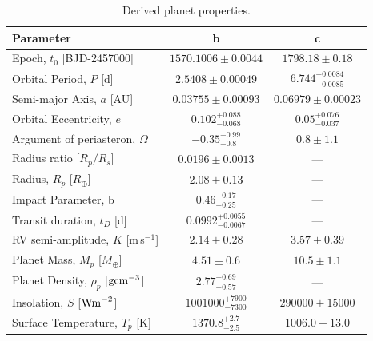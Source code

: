 \documentclass[fleqn,usenatbib]{mnras}
\newcommand{\ms}{m\,s$^{-1}$}
\begin{document}
\begin{table}
	\centering
	\caption{Derived planet properties.}
	\label{tab:derived_pars}
\begin{tabular}{lcc}
\hline
\hline
Parameter & b & c\\
\hline
\hline
Epoch, $t_0$ [BJD-2457000] &  $ 1570.1006 \pm 0.0044 $  &  $ 1798.18 \pm 0.18 $  \\
Orbital Period, $P$ [d] &  $ 2.5408 \pm 0.00049 $  &  $ 6.744^{+0.0084}_{-0.0085} $  \\
Semi-major Axis, $a$ [AU] &  $ 0.03755 \pm 0.00093 $  &  $ 0.06979 \pm 0.00023 $  \\
Orbital Eccentricity, $e$ &  $ 0.102^{+0.088}_{-0.068} $  &  $ 0.05^{+0.076}_{-0.037} $  \\
Argument of periasteron, $\Omega$ &  $ -0.35^{+0.99}_{-0.8} $  &  $ 0.8 \pm 1.1 $  \\
Radius ratio [$R_p/R_s$] &  $ 0.0196 \pm 0.0013 $  & --- \\
Radius, $R_p$ [$R_\oplus$] &  $ 2.08 \pm 0.13 $  & --- \\
Impact Parameter, b &  $ 0.46^{+0.17}_{-0.25} $  & --- \\
Transit duration, $t_D$ [d] &  $ 0.0992^{+0.0055}_{-0.0067} $  & --- \\
RV semi-amplitude, $K$ [\ms{}] &  $ 2.14 \pm 0.28 $  &  $ 3.57 \pm 0.39 $  \\
Planet Mass, $M_p$ [$M_\oplus$] &  $ 4.51 \pm 0.6 $  &  $ 10.5 \pm 1.1 $  \\
Planet Density, $\rho_p$ [${\rm gcm}^{-3}$] &  $ 2.77^{+0.69}_{-0.57} $  & --- \\
Insolation, $S$ [${\rm Wm}^{-2}$] &  $ 1001000^{+7900}_{-7300} $  &  $ 290000 \pm 15000 $  \\
Surface Temperature, $T_p$ [K] &  $ 1370.8^{+2.7}_{-2.5} $  &  $ 1006.0 \pm 13.0 $  \\
\hline
\hline
\end{tabular}
\end{table}
\end{document}
